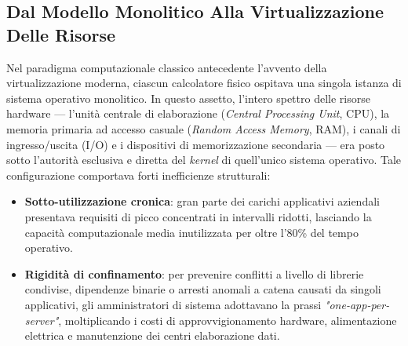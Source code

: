 \documentclass[11pt, a4paper]{article}
\begin{document}
\subsection{Dal Modello Monolitico Alla Virtualizzazione Delle Risorse}

Nel paradigma computazionale classico antecedente l'avvento della virtualizzazione moderna, ciascun calcolatore fisico ospitava una singola istanza di sistema operativo monolitico. In questo assetto, l'intero spettro delle risorse hardware --- l'unità centrale di elaborazione (\emph{Central Processing Unit}, CPU), la memoria primaria ad accesso casuale (\emph{Random Access Memory}, RAM), i canali di ingresso/uscita (I/O) e i dispositivi di memorizzazione secondaria --- era posto sotto l'autorità esclusiva e diretta del \emph{kernel} di quell'unico sistema operativo. Tale configurazione comportava forti inefficienze strutturali:
\begin{itemize}
    \item \textbf{Sotto-utilizzazione cronica}: gran parte dei carichi applicativi aziendali presentava requisiti di picco concentrati in intervalli ridotti, lasciando la capacità computazionale media inutilizzata per oltre l'80\% del tempo operativo.
    \item \textbf{Rigidità di confinamento}: per prevenire conflitti a livello di librerie condivise, dipendenze binarie o arresti anomali a catena causati da singoli applicativi, gli amministratori di sistema adottavano la prassi \emph{"one-app-per-server"}, moltiplicando i costi di approvvigionamento hardware, alimentazione elettrica e manutenzione dei centri elaborazione dati.
\end{itemize}

\end{document}
